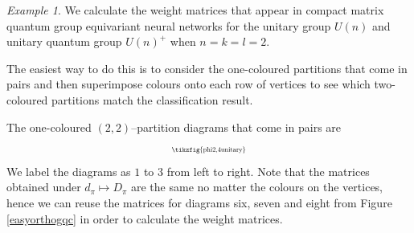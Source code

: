 \documentclass{article}
\theoremstyle{plain}
\theoremstyle{definition}
\theoremstyle{remark}
\newtheorem{example}[theorem]{Example}
\begin{document}
\begin{example}
We calculate the weight matrices that appear in compact matrix quantum group 
equivariant neural networks for the unitary group $U(n)$
and unitary quantum group $U(n)^{+}$
when $n = k = l = 2$.

The easiest way to do this is to consider the one-coloured partitions that come in pairs and then superimpose colours onto each row of vertices to see which two-coloured partitions match the classification result.

The one-coloured $(2,2)$--partition diagrams that come in pairs are
\begin{equation}
	\begin{aligned}
		\scalebox{0.6}{\tikzfig{phi2,4unitary}}
	\end{aligned}
\end{equation}
We label the diagrams as $1$ to $3$ from left to right.
Note that the matrices obtained under $d_\pi \mapsto D_\pi$ are the same no matter the colours on the vertices,
hence we can reuse the matrices for diagrams six, seven and eight from Figure \ref{easyorthogqc} in order to calculate the weight matrices.


\end{example}
\end{document}

